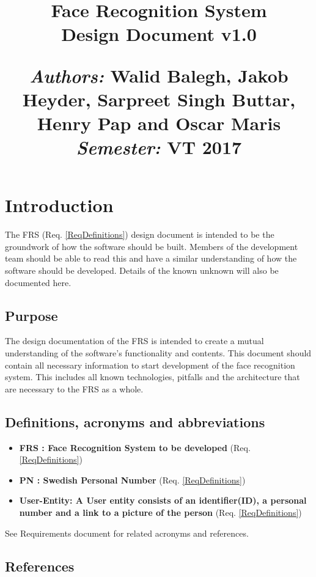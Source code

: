 \documentclass[a4paper,11pt]{article}
\title{
\vspace{-8cm}
\begin{flushleft}
    \vspace{10cm}
    \normalfont \normalsize
    \vspace{-1.3cm}
\end{flushleft}
\vspace{3cm}
\begin{flushleft}
    \huge Face Recognition System \\
    \LARGE  Design Document v1.0\\
\end{flushleft}
\null
\vfill
\begin{minipage}{\textwidth}
\begin{flushleft} \large
\emph{Authors:} Walid Balegh, Jakob Heyder, Sarpreet Singh Buttar, Henry \hspace{45pt} Pap and Oscar Maris \\ %
\emph{Semester:} VT 2017\\ %
\end{flushleft}
\end{minipage}
}
\date{}
\begin{document}
\maketitle

\newpage

\tableofcontents

\newpage


\section{Introduction}
The FRS (Req. \ref{ReqDefinitions}) design document is intended to be the groundwork of how the software should be built. Members of the development team should be able to read this and have a similar understanding of how the software should be developed. Details of the known unknown will also be documented here.

\subsection{Purpose}
The design documentation of the FRS is intended to create a mutual understanding of the software's functionality and contents. This document should contain all necessary information to start development of the face recognition system. This includes all known technologies, pitfalls and the architecture that are necessary to the FRS as a whole. 

\subsection{Definitions, acronyms and abbreviations}
\begin{itemize}
 
\item \textbf{FRS : Face Recognition System to be developed} (Req. \ref{ReqDefinitions})
\item \textbf{PN : Swedish Personal Number} (Req. \ref{ReqDefinitions})
\item \textbf{User-Entity: A User entity consists of an identifier(ID), a personal number and a link to a picture of the person} (Req. \ref{ReqDefinitions})
\end{itemize}
 
See Requirements document for related acronyms and references.

\subsection{References}
\end{document}
